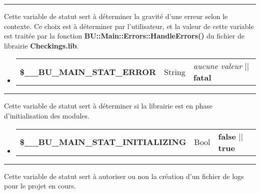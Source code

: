 \documentclass[a4paper,10pt]{article}
\begin{document}
\par\noindent\rule{\textwidth}{0.4pt}

\begin{justify}
    Cette variable de statut sert à déterminer la gravité d'une erreur selon le contexte. Ce choix est à déterminer par l'utilisateur, et la valeur de cette variable est traitée par la fonction \textbf{\color{mauve}BU::Main::Errors::HandleErrors()} du fichier de librairie \textbf{\color{lime}Checkings.lib}.
\end{justify}

\begin{justify}
     \begin{itemize}
        \item
        {
            \begin{tabular}{l|l|l}
                \textbf{\color{orange}\$\_\_BU\_MAIN\_STAT\_ERROR}  & String    & \textit{aucune valeur} || \textbf{fatal}\\[1\baselineskip]
            \end{tabular}
        }
    \end{itemize}
\end{justify}


\par\noindent\rule{\textwidth}{0.4pt}

\begin{justify}
    Cette variable de statut sert à déterminer si la librairie est en phase d'initialisation des modules.
\end{justify}

\begin{justify}
     \begin{itemize}
        \item
        {
            \begin{tabular}{l|l|l}
                \textbf{\color{orange}\$\_\_BU\_MAIN\_STAT\_INITIALIZING}       & Bool  & \textbf{false} || \textbf{true}\\[1\baselineskip]
            \end{tabular}
        }
    \end{itemize}
\end{justify}


\par\noindent\rule{\textwidth}{0.4pt}

\begin{justify}
    Cette variable de statut sert à autoriser ou non la création d'un fichier de logs pour le projet en cours.
\end{justify}
\end{document}
